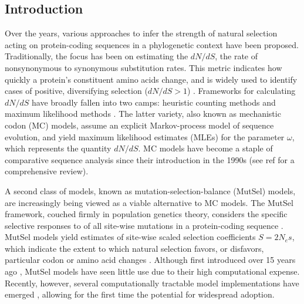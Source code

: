\documentclass{pnastwo}
\begin{document}
\begin{article}
		
\section*{Introduction}
		
Over the years, various approaches to infer the strength of natural selection acting on protein-coding sequences in a phylogenetic context have been proposed. Traditionally, the focus has been on estimating the $dN/dS$, the rate of nonsynonymous to synonymous substitution rates. This metric indicates how quickly a protein's constituent amino acids change, and is widely used to identify cases of positive, diversifying selection ($dN/dS > 1$) \cite{NielsenYang1998, Yangetal2000, KosakovskyPondFrost2005b, Huelsenbecketal2006}. 
Frameworks for calculating $dN/dS$ have broadly fallen into two camps: heuristic counting methods \cite{LWL85,NG86,Pamilo1993,Ina1995,YN00} and maximum likelihood methods \cite{GoldmanYang1994,MuseGaut1994,NielsenYang1998,Yang2006}. The latter variety, also known as mechanistic codon (MC) models, assume an explicit Markov-process model of sequence evolution, and yield maximum likelihood estimates (MLEs) for the parameter $\omega$, which represents the quantity $dN/dS$. MC models have become a staple of comparative sequence analysis since their introduction in the 1990s (see ref \cite{Anisimova2009} for a comprehensive review).
		
A second class of models, known as mutation-selection-balance (MutSel) models, are increasingly being viewed as a viable alternative to MC models. The MutSel framework, couched firmly in population genetics theory, considers the specific selective responses to of all site-wise mutations in a protein-coding sequence \cite{HalpernBruno1998,Thorne2012}. MutSel models yield estimates of site-wise scaled selection coefficients $S=2N_es$, which indicate the extent to which natural selection favors, or disfavors, particular codon or amino acid changes \cite{HalpernBruno1998,YangNielsen2008,Rodrigueetal2010,Tamurietal2012}. Although first introduced over 15 years ago \cite{HalpernBruno1998}, MutSel models have seen little use due to their high computational expense. Recently, however, several computationally tractable model implementations have emerged \cite{RodrigueLartillot2014,Tamurietal2014}, allowing for the first time the potential for widespread adoption. 
		

\end{article}
\end{document}
